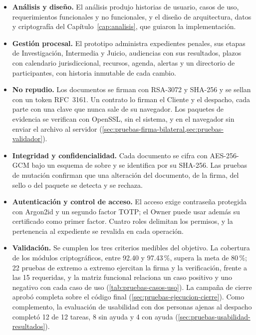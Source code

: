 \begin{itemize}
  \item \textbf{Análisis y diseño.} El análisis produjo historias de usuario,
        casos de uso, requerimientos funcionales y no funcionales, y el diseño
        de arquitectura, datos y criptografía del
        Capítulo~\ref{cap:analisis}, que guiaron la implementación.
  \item \textbf{Gestión procesal.} El prototipo administra expedientes penales,
        sus etapas de Investigación, Intermedia y Juicio, audiencias con sus
        resultados, plazos con calendario jurisdiccional, recursos, agenda,
        alertas y un directorio de participantes, con historia inmutable de
        cada cambio.
  \item \textbf{No repudio.} Los documentos se firman con RSA-3072 y SHA-256 y
        se sellan con un token RFC~3161. Un contrato lo firman el Cliente y el
        despacho, cada parte con una clave que nunca sale de su navegador. Los
        paquetes de evidencia se verifican con OpenSSL, sin el sistema, y en el
        navegador sin enviar el archivo al servidor
        (\cref{sec:pruebas-firma-bilateral,sec:pruebas-validador}).
  \item \textbf{Integridad y confidencialidad.} Cada documento se cifra con
        AES-256-GCM bajo un esquema de sobre y se identifica por su SHA-256.
        Las pruebas de mutación confirman que una alteración del documento, de
        la firma, del sello o del paquete se detecta y se rechaza.
  \item \textbf{Autenticación y control de acceso.} El acceso exige contraseña
        protegida con Argon2id y un segundo factor TOTP; el Owner puede usar
        además su certificado como primer factor. Cuatro roles delimitan los
        permisos, y la pertenencia al expediente se revalida en cada operación.
  \item \textbf{Validación.} Se cumplen los tres criterios medibles del
        objetivo. La cobertura de los módulos criptográficos, entre 92.40 y
        97.43\,\%, supera la meta de 80\,\%; 22 pruebas de extremo a extremo
        ejercitan la firma y la verificación, frente a las 15 requeridas, y
        la matriz funcional relaciona un caso positivo y uno negativo con
        cada caso de uso (\cref{tab:pruebas-casos-uso}). La campaña de cierre
        aprobó completa sobre el código final
        (\cref{sec:pruebas-ejecucion-cierre}). Como complemento, la
        evaluación de usabilidad con dos personas ajenas al despacho completó
        12 de 12 tareas, 8 sin ayuda y 4 con ayuda
        (\cref{sec:pruebas-usabilidad-resultados}).
\end{itemize}

